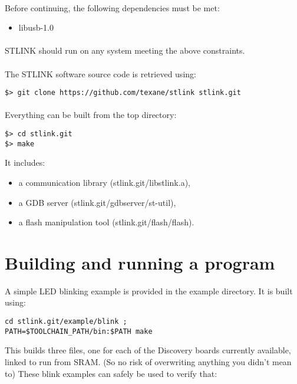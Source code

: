 \documentclass[a4paper, 11pt]{article}
\begin{document}
\paragraph{}
Before continuing, the following dependencies must be met:
\begin{itemize}
\item libusb-1.0
\end{itemize}

\paragraph{}
STLINK should run on any system meeting the above constraints.

\paragraph{}
The STLINK software source code is retrieved using:\\
\begin{small}
\begin{lstlisting}[frame=tb]
$> git clone https://github.com/texane/stlink stlink.git
\end{lstlisting}
\end{small}

\paragraph{}
Everything can be built from the top directory:\\
\begin{small}
\begin{lstlisting}[frame=tb]
$> cd stlink.git
$> make 
\end{lstlisting}
\end{small}
It includes:
\begin{itemize}
\item a communication library (stlink.git/libstlink.a),
\item a GDB server (stlink.git/gdbserver/st-util),
\item a flash manipulation tool (stlink.git/flash/flash).
\end{itemize}


\newpage

\section{Building and running a program}
A simple LED blinking example is provided in the example directory. It is built using:\\
\begin{small}
\begin{lstlisting}[frame=tb]
cd stlink.git/example/blink ;
PATH=$TOOLCHAIN_PATH/bin:$PATH make
\end{lstlisting}
\end{small}
This builds three files, one for each of the Discovery boards currently
available, linked to run from SRAM. (So no risk of overwriting anything you didn't mean to) 
These blink examples can safely be used to verify that:
\end{document}
